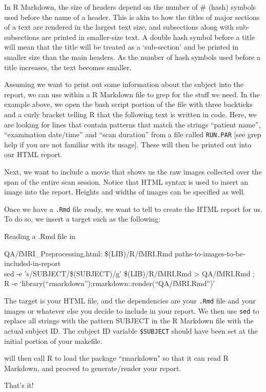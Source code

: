 In R Markdown, the size of headers depend on the number of \# (hash) symbols used before the name of a header. This is akin to how the titles of major sections of a text are rendered in the largest text size, and subsections along with sub-subsections are printed in smaller-size text. A double hash symbol before a title will mean that the title will be treated as a `sub-section' and be printed in smaller size than the main headers. As the number of hash symbols used before a title increases, the text becomes smaller.


Assuming we want to print out some information about the subject into the report, we can use \bashn{} within a R Markdown file to grep for the stuff we need. In the example above, we open the bash script portion of the file with three backticks and a curly bracket telling R that the following text is written in \bashn{} code. Here, we are looking for lines that contain patterns that match the strings ``patient name'', ``examination date/time'' and ``scan duration'' from a file called \texttt{RUN.PAR} [see grep help if you are not familiar with its usage]. These will then be printed out into our HTML report.

Next, we want to include a movie that shows us the raw images collected over the span of the entire scan session. Notice that HTML syntax is used to insert an image into the report. Heights and widths of images can be specified as well. 

Once we have a \texttt{.Rmd} file ready, we want to tell \maken{} to create the HTML report for us. To do so, we insert a target such as the following:

\begin{make}{Reading a .Rmd file in \maken{}}{}
	
	QA/fMRI_Preprocessing.html: \$(LIB)/R/fMRI.Rmd paths-to-images-to-be-included-in-report \\
	\tab sed -e 's/SUBJECT/\$(SUBJECT)/g' \$(LIB)/R/fMRI.Rmd > QA/fMRI.Rmd ;\ \\
	\tab R -e `library(``rmarkdown'');rmarkdown::render(``QA/fMRI.Rmd'')' \\
\end{make}

The target is your HTML file, and the dependencies are your \texttt{.Rmd} file and your images or whatever else you decide to include in your report. We then use \texttt{sed} to replace all strings with the pattern SUBJECT in the R Markdown file with the actual subject ID. The subject ID variable \texttt{\$SUBJECT} should have been set at the initial portion of your makefile. 

\maken{} will then call R to load the package ``rmarkdown" so that it can read R Markdown, and proceed to generate/render your report.

That's it! 













